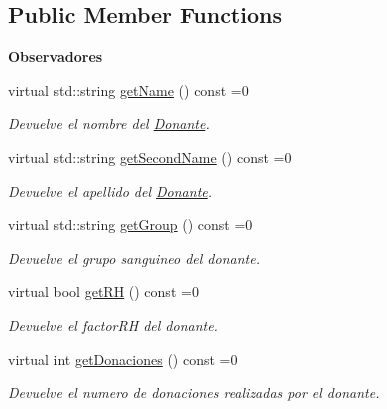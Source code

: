 \subsection*{Public Member Functions}
\begin{Indent}{\bf Observadores}\par
\begin{DoxyCompactItemize}
\item 
virtual std\+::string \hyperlink{classed_1_1DonanteInterfaz_acc116c503c26b5dee7c8982e56e5cd59}{get\+Name} () const =0
\begin{DoxyCompactList}\small\item\em Devuelve el nombre del \hyperlink{classed_1_1Donante}{Donante}. \end{DoxyCompactList}\item 
virtual std\+::string \hyperlink{classed_1_1DonanteInterfaz_ad00f542962f6585da7b465c48e65a6e9}{get\+Second\+Name} () const =0
\begin{DoxyCompactList}\small\item\em Devuelve el apellido del \hyperlink{classed_1_1Donante}{Donante}. \end{DoxyCompactList}\item 
virtual std\+::string \hyperlink{classed_1_1DonanteInterfaz_a094e88f0c9cd5c7391d5c06a09a667a1}{get\+Group} () const =0
\begin{DoxyCompactList}\small\item\em Devuelve el grupo sanguineo del donante. \end{DoxyCompactList}\item 
virtual bool \hyperlink{classed_1_1DonanteInterfaz_a3607867d874ea4fe71813acb41a0b0ef}{get\+RH} () const =0
\begin{DoxyCompactList}\small\item\em Devuelve el factor\+RH del donante. \end{DoxyCompactList}\item 
virtual int \hyperlink{classed_1_1DonanteInterfaz_a0e72966c68cab8ccb8da1c493a3a6f56}{get\+Donaciones} () const =0
\begin{DoxyCompactList}\small\item\em Devuelve el numero de donaciones realizadas por el donante. \end{DoxyCompactList}\end{DoxyCompactItemize}
\end{Indent}

